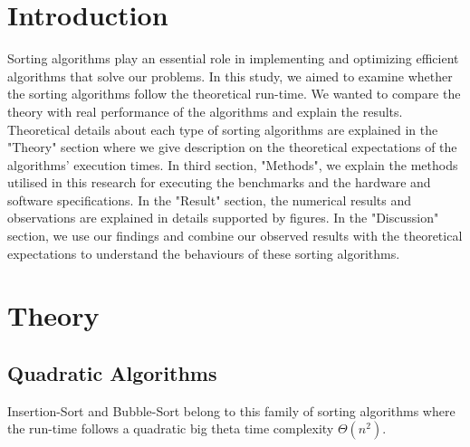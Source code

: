 \documentclass[sigconf, nonacm, natbib, screen, balance=False]{acmart}
\begin{document}
\section{Introduction}\label{sec:intro}
Sorting algorithms play an essential role in implementing and optimizing efficient algorithms that solve our problems. In this study, we aimed to examine whether the sorting algorithms follow the theoretical run-time. We wanted to compare the theory with real performance of the algorithms and explain the results. Theoretical details about each type of sorting algorithms are explained in the "Theory" section where we give description on the theoretical expectations of the algorithms' execution times. In third section, "Methods", we explain the methods utilised in this research for executing the benchmarks and the hardware and software specifications. In the "Result" section, the numerical results and observations are explained in details supported by figures. In the "Discussion" section, we use our findings and combine our observed results with the theoretical expectations to understand the behaviours of these sorting algorithms. 

\section{Theory}\label{sec:theory}

\subsection{Quadratic Algorithms}
Insertion-Sort and Bubble-Sort belong to this family of sorting algorithms where the run-time follows a quadratic big theta time complexity $\Theta(n^2)$.  
\end{document}
